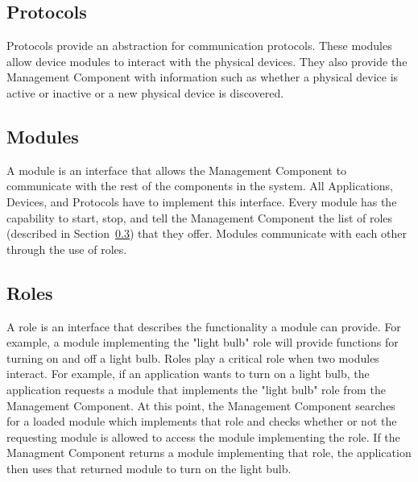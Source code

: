 \subsection{Protocols}
\label{sec:protocols}
Protocols provide an abstraction for communication protocols. These modules
allow device modules to interact with the physical devices. They also provide
the Management Component with information such as whether a physical device is
active or inactive or a new physical device is discovered.
\subsection{Modules}
\label{sec:mods}
A module is an interface that allows the Management Component to communicate
with the rest of the components in the system. All Applications, Devices, and
Protocols have to implement this interface. Every module has the capability to
start, stop, and tell the Management Component the list of roles (described in 
Section~\ref{sec:roles}) that they offer. Modules communicate with each
other through the use of roles.
\subsection{Roles}
\label{sec:roles}
A role is an interface that describes the functionality a module can provide. 
For example, a module implementing the "light bulb" role will provide functions
for turning on and off a light bulb. Roles play a critical role when two
modules interact. For example, if an application wants to turn on a light bulb,
the application requests a module that implements the "light bulb" role from 
the Management Component. At this point, the Management Component searches for a
loaded module which implements that role and checks whether or not the
requesting module is allowed to access the module implementing the role. If the
Managment Component returns a module implementing that role, the application
then uses that returned module to turn on the light bulb.
